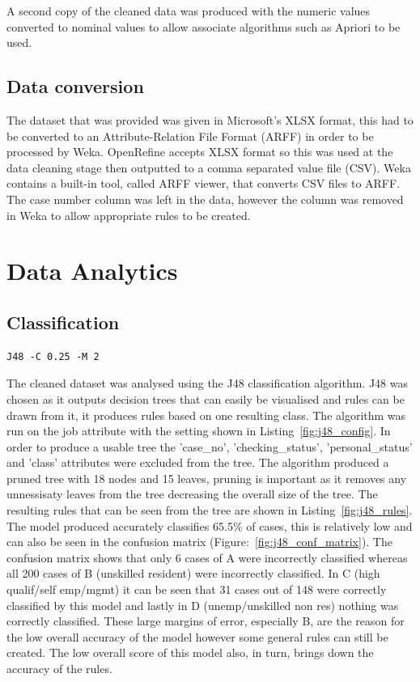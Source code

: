 \documentclass[12pt]{article}
\begin{document}
A second copy of the cleaned data was produced with the numeric values converted to nominal values to allow associate algorithms such as Apriori to be used.

\subsection{Data conversion}
The dataset that was provided was given in Microsoft's XLSX format, this had to be converted to an Attribute-Relation File Format (ARFF) in order to be processed by Weka. OpenRefine accepts XLSX format so this was used at the data cleaning stage then outputted to a comma separated value file (CSV). Weka contains a built-in tool, called ARFF viewer, that converts CSV files to ARFF. The case number column was left in the data, however the column was removed in Weka to allow appropriate rules to be created.
\section{Data Analytics}
\subsection{Classification}

\begin{lstlisting}[caption="J48 configuration"\label{fig:j48_config}]
J48 -C 0.25 -M 2
\end{lstlisting}

The cleaned dataset was analysed using the J48 classification algorithm. J48 was chosen as it outputs decision trees that can easily be visualised and rules can be drawn from it, it produces rules based on one resulting class. The algorithm was run on the job attribute with the setting shown in Listing~\ref{fig:j48_config}. In order to produce a usable tree the 'case\_no', 'checking\_status', 'personal\_status' and 'class' attributes were excluded from the tree. The algorithm produced a pruned tree with 18 nodes and 15 leaves, pruning is important as it removes any unnessisaty leaves from the tree decreasing the overall size of the tree. The resulting rules that can be seen from the tree are shown in Listing~\ref{fig:j48_rules}. The model produced accurately classifies 65.5\% of cases, this is relatively low and can also be seen in the confusion matrix (Figure:~\ref{fig:j48_conf_matrix}). The confusion matrix shows that only 6 cases of A were incorrectly classified whereas all 200 cases of B (unskilled resident) were incorrectly classified. In C (high qualif/self emp/mgmt) it can be seen that 31 cases out of 148 were correctly classified by this model and lastly in D (unemp/unskilled non res) nothing was correctly classified. These large margins of error, especially B, are the reason for the low overall accuracy of the model however some general rules can still be created. The low overall score of this model also, in turn, brings down the accuracy of the rules.
\end{document}
